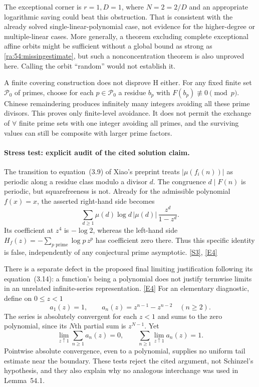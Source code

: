 \documentclass[11pt]{article}
\newcommand{\sref}[2]{\hyperlink{source:#1:#2}{[S#2]}}
\newcommand{\eref}[2]{\hyperlink{extra:#1:#2}{[E#2]}}
\begin{document}
The exceptional corner is $r=1,D=1$, where $N=2=2/D$ and an appropriate
logarithmic saving could beat this obstruction. That is consistent with
the already solved single-linear-polynomial case, not evidence for the
higher-degree or multiple-linear cases. More generally, a theorem
excluding complete exceptional affine orbits might be sufficient without
a global bound as strong as \eqref{ra:54:missingestimate}, but such a
nonconcentration theorem is also unproved here. Calling the orbit
``random'' would not establish it.

A finite covering construction does not disprove H either. For any fixed
finite set $\mathcal P_0$ of primes, choose for each $p\in\mathcal P_0$
a residue $b_p$ with $F(b_p)\not\equiv0\pmod p$. Chinese remaindering
produces infinitely many integers avoiding all these prime divisors.
This proves only finite-level avoidance. It does not permit the exchange
of $\forall$ finite prime sets with one integer avoiding all primes, and
the surviving values can still be composite with larger prime factors.

\paragraph{Stress test: explicit audit of the cited solution claim.}
The transition to equation~(3.9) of Xiao's preprint treats
$|\mu(f_i(n))|$ as periodic along a residue class modulo a divisor $d$.
The congruence $d\mid F(n)$ is periodic, but squarefreeness is not.
Already for the admissible polynomial $f(x)=x$, the asserted right-hand
side becomes
\[
 \sum_{d\ge1}\mu(d)\log d\,|\mu(d)|\,
       \frac{z^d}{1-z^d}.
\]
Its coefficient at $z^4$ is $-\log2$, whereas the left-hand side
$H_f(z)=-\sum_{p\text{ prime}}\log p\,z^p$ has coefficient zero there.
Thus this specific identity is false, independently of any conjectural
prime asymptotic. \sref{54}{3}, \eref{54}{4}

There is a separate defect in the proposed final limiting justification
following its equation~(3.14): a function's being a polynomial does not
justify termwise limits in an unrelated infinite-series representation.
\eref{54}{4}
For an elementary diagnostic, define on $0\le z<1$
\[
 a_1(z)=1,\qquad a_n(z)=z^{n-1}-z^{n-2}\quad(n\ge2).
\]
The series is absolutely convergent for each $z<1$ and sums to the zero
polynomial, since its $N$th partial sum is $z^{N-1}$. Yet
\[
 \lim_{z\uparrow1}\sum_{n\ge1}a_n(z)=0,
 \qquad
 \sum_{n\ge1}\lim_{z\uparrow1}a_n(z)=1.
\]
Pointwise absolute convergence, even to a polynomial, supplies no
uniform tail estimate near the boundary. These tests reject the cited
argument, not Schinzel's hypothesis, and they also explain why no
analogous interchange was used in Lemma~54.1.
\end{document}
